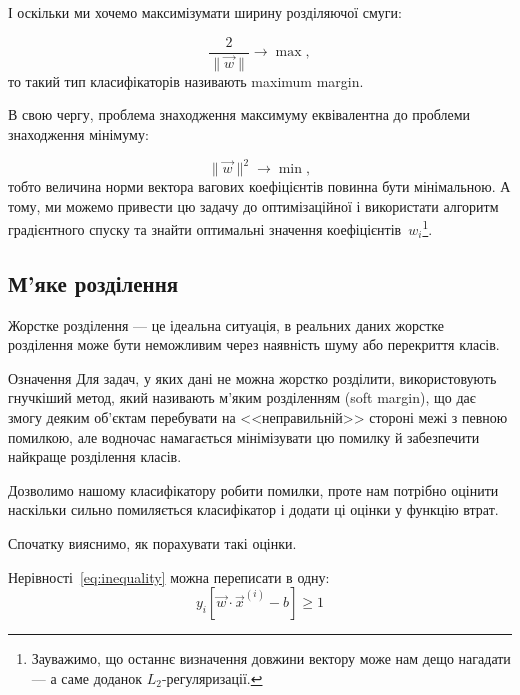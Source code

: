 \documentclass[]{article}
\begin{document}
І оскільки ми хочемо максимізумати ширину розділяючої смуги:

\begin{equation*}
    \dfrac2{\|\vec{w}\|} \to \max,
\end{equation*}
то такий тип класифікаторів називають maximum margin.

В свою чергу, проблема знаходження максимуму еквівалентна до проблеми знаходження мінімуму:

\begin{equation*}
   \|\vec{w}\|^2 \to \min,
\end{equation*}
тобто величина норми вектора вагових коефіцієнтів повинна бути мінімальною. А тому, ми можемо привести цю задачу до оптимізаційної і використати алгоритм градієнтного спуску та знайти оптимальні значення коефіцієнтів~$w_i$\footnote{Зауважимо, що останнє визначення довжини вектору може нам дещо нагадати --- а саме доданок $L_2$-регуляризації.}.



\subsection{М'яке розділення}

Жорстке розділення --- це ідеальна ситуація, в реальних даних жорстке розділення може бути неможливим через наявність шуму або перекриття класів.

\begin{defbox}{Означення}
Для задач, у яких дані не можна жорстко розділити, використовують гнучкіший метод, який називають м'яким розділенням (soft margin), що дає змогу деяким об'єктам перебувати на <<неправильній>> стороні межі з певною помилкою, але водночас намагається мінімізувати цю помилку й забезпечити найкраще розділення класів.
\end{defbox}



Дозволимо нашому класифікатору робити помилки, проте нам потрібно оцінити наскільки сильно помиляється класифікатор і додати ці оцінки у функцію втрат.

Спочатку вияснимо, як порахувати такі оцінки.

Нерівності~\eqref{eq:inequality} можна переписати в одну:
\begin{equation}\label{eq:integrateg_ineq}
    y_i \left[ \vec{w}\cdot \vec{x}^{(i)} - b \right] \geqslant 1
\end{equation}
\end{document}
